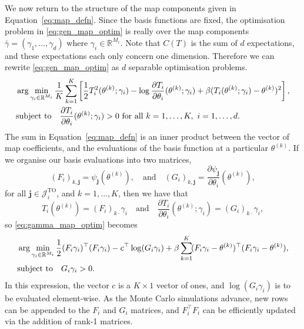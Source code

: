 \documentclass[final]{siamltex}
\begin{document}
We now return to the structure of the map components given in Equation~\eqref{eq:map_defn}. Since the basis functions are
fixed, the optimisation problem in \eqref{eq:gen_map_optim} is really over the map components $\bar{\gamma} = (\gamma_1, \dots,
\gamma_d)$ where $\gamma_i \in \mathbb{R}^{M_i}$. Note that $C(T)$ is the sum of $d$ expectations, and these expectations each only concern one dimension. Therefore we can rewrite \eqref{eq:gen_map_optim} as $d$ separable optimisation problems.
\begin{align}\label{eq:gamma_map_optim}
	&\arg\min_{\gamma_i\in\mathbb{R}^{M_i}} \frac{1}{K}\sum\limits_{k=1}^K
		\left[\frac{1}{2}T_i^2(\theta^{(k)}; \gamma_i) - \log\frac{\partial T_i}{\partial\theta_i}(\theta^{(k)}; \gamma_i) + \beta(T_i(\theta^{(k)};
		\gamma_i)-\theta^{(k)})^2\right], \\
	&\text{subject to} \quad \frac{\partial T_i}{\partial\theta_i}(\theta^{(k)};
		\gamma_i) > 0 \ \text{for all}\ k=1,\dots,K,\ i=1,\dots,d.
		\notag
\end{align}
The sum in Equation~\eqref{eq:map_defn} is an inner
product between the vector of map coefficients, and the evaluations of the basis function at a
particular $\theta^{(k)}$. If we organise our basis evaluations into two matrices,
\[
	(F_i)_{k,\mathbf{j}} = \psi_\mathbf{j}(\theta^{(k)}), \quad \text{and} \quad (G_i)_{k,\mathbf{j}} =
\frac{\partial\psi_\mathbf{j}}{\partial\theta_i}(\theta^{(k)}),
\]
for all $\mathbf{j}
\in \mathcal{J}_i^\text{TO}$, and $k = 1,\dots,K$, then we have that
\[
	T_i(\theta^{(k)}) = (F_i)_{k\cdot}\gamma_i \quad \text{and} \quad \frac{\partial T_i}{\partial \theta_i}(\theta^{(k)}; \gamma_i) = (G_i)_{k\cdot}\gamma_i,
\]
so \eqref{eq:gamma_map_optim} becomes
\begin{align}\label{eq:blas_map_optim}
	&\arg\min_{\gamma_i\in\mathbb{R}^{M_i}} \frac{1}{2}(F_i\gamma_i)^\top(F_i\gamma_i) -
		c^\top\log(G_i\gamma_i) + \beta\sum\limits_{k=1}^K \!
		(F_i\gamma_i-\theta^{(k)})^\top(F_i\gamma_i-\theta^{(k)}), \\
	&\text{subject to} \quad G_i\gamma_i > 0. \notag
\end{align}
In this expression, the vector $c$ is a $K\times 1$ vector of ones, and $\log(G_i\gamma_i)$ is to be
evaluated element-wise. As the Monte Carlo simulations advance, new rows can be appended to the
$F_i$ and $G_i$ matrices, and $F_i^\top F_i$ can be efficiently updated via the addition of rank-1 matrices.
\end{document}
